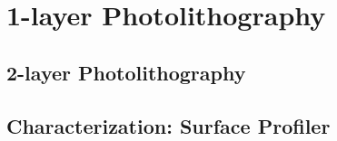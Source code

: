 

\chapter{1-layer Photolithography}
\label{1-layer-photolithography}


\section{2-layer Photolithography}
\label{2-layer-photolithography}

\section{Characterization: Surface Profiler}
\label{characterization-surface-profiler}
